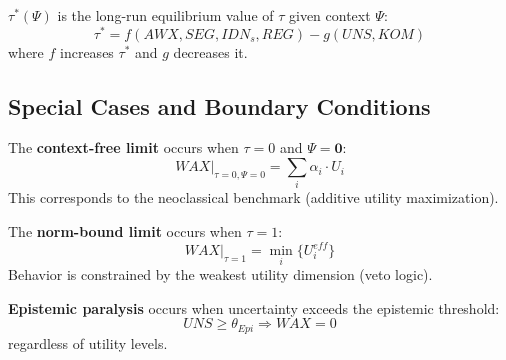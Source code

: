 \begin{definition}
\label{def:tau-star}
$\tau^*(\Psi)$ is the long-run equilibrium value of $\tau$ given context $\Psi$:
\begin{equation}
\tau^* = f(AWX, SEG, IDN_s, REG) - g(UNS, KOM)
\end{equation}
where $f$ increases $\tau^*$ and $g$ decreases it.
\end{definition}


\subsection{Special Cases and Boundary Conditions}

\begin{definition}
\label{def:context-free}
The \textbf{context-free limit} occurs when $\tau = 0$ and $\Psi = \mathbf{0}$:
\begin{equation}
WAX|_{\tau=0, \Psi=0} = \sum_i \alpha_i \cdot U_i
\end{equation}
This corresponds to the neoclassical benchmark (additive utility maximization).
\end{definition}

\begin{definition}
\label{def:norm-bound}
The \textbf{norm-bound limit} occurs when $\tau = 1$:
\begin{equation}
WAX|_{\tau=1} = \min_i \{U_i^{eff}\}
\end{equation}
Behavior is constrained by the weakest utility dimension (veto logic).
\end{definition}

\begin{definition}
\label{def:epistemic-paralysis}
\textbf{Epistemic paralysis} occurs when uncertainty exceeds the epistemic threshold:
\begin{equation}
UNS \geq \theta_{Epi} \Rightarrow WAX = 0
\end{equation}
regardless of utility levels.
\end{definition}



